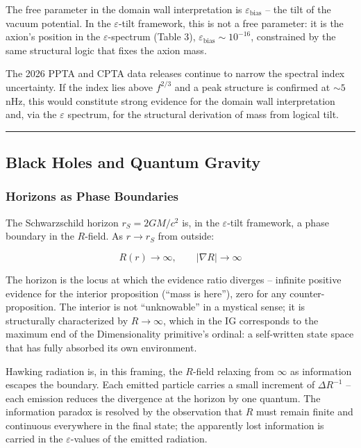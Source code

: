 The free parameter in the domain wall interpretation is
\(\varepsilon_\text{bias}\) -- the tilt of the vacuum potential. In the
\(\varepsilon\)-tilt framework, this is not a free parameter: it is the
axion's position in the \(\varepsilon\)-spectrum (Table 3),
\(\varepsilon_\text{bias} \sim 10^{-16}\), constrained by the same
structural logic that fixes the axion mass.

The 2026 PPTA and CPTA data releases continue to narrow the spectral
index uncertainty. If the index lies above \(f^{2/3}\) and a peak
structure is confirmed at \(\sim 5\) nHz, this would constitute strong
evidence for the domain wall interpretation and, via the \(\varepsilon\)
spectrum, for the structural derivation of mass from logical tilt.

\begin{center}\rule{0.5\linewidth}{0.5pt}\end{center}

\hypertarget{black-holes-and-quantum-gravity}{%
\subsection{Black Holes and Quantum
Gravity}\label{black-holes-and-quantum-gravity}}

\hypertarget{horizons-as-phase-boundaries}{%
\subsubsection{Horizons as Phase
Boundaries}\label{horizons-as-phase-boundaries}}

The Schwarzschild horizon \(r_S = 2GM/c^2\) is, in the
\(\varepsilon\)-tilt framework, a phase boundary in the \(R\)-field. As
\(r \to r_S\) from outside:

\[R(r) \to \infty, \qquad |\nabla R| \to \infty\]

The horizon is the locus at which the evidence ratio diverges --
infinite positive evidence for the interior proposition (``mass is
here''), zero for any counter-proposition. The interior is not
``unknowable'' in a mystical sense; it is structurally characterized by
\(R \to \infty\), which in the IG corresponds to the maximum end of the
Dimensionality primitive's ordinal: a self-written state space that has
fully absorbed its own environment.

Hawking radiation is, in this framing, the \(R\)-field relaxing from
\(\infty\) as information escapes the boundary. Each emitted particle
carries a small increment of \(\Delta R^{-1}\) -- each emission reduces
the divergence at the horizon by one quantum. The information paradox is
resolved by the observation that \(R\) must remain finite and continuous
everywhere in the final state; the apparently lost information is
carried in the \(\varepsilon\)-values of the emitted radiation.

